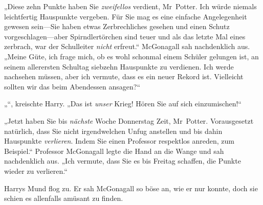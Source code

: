 „Diese zehn Punkte haben Sie \emph{zweifellos} verdient, Mr~Potter. Ich würde niemals leichtfertig Hauspunkte vergeben. Für Sie mag es eine einfache Angelegenheit gewesen sein—Sie haben etwas Zerbrechliches gesehen und einen Schutz vorgeschlagen—aber Spirndlertörchen sind teuer und als das letzte Mal eines zerbrach, war der Schulleiter \emph{nicht} erfreut.“ McGonagall sah nachdenklich aus. „Meine Güte, ich frage mich, ob es wohl schonmal einem Schüler gelungen ist, an seinem allerersten Schultag siebzehn Hauspunkte zu verdienen. Ich werde nachsehen müssen, aber ich vermute, dass es ein neuer Rekord ist. Vielleicht sollten wir das beim Abendessen ansagen?“

„“, kreischte Harry. „Das ist \emph{unser} Krieg! Hören Sie auf sich einzumischen!“

„Jetzt haben Sie bis \emph{nächste} Woche Donnerstag Zeit, Mr~Potter. Vorausgesetzt natürlich, dass Sie nicht irgendwelchen Unfug anstellen und bis dahin Hauspunkte \emph{verlieren}. Indem Sie einen Professor respektlos anreden, zum Beispiel.“ Professor McGonagall legte die Hand an die Wange und sah nachdenklich aus. „Ich vermute, dass Sie es bis Freitag schaffen, die Punkte wieder zu verlieren.“

Harrys Mund flog zu. Er sah McGonagall so böse an, wie er nur konnte, doch sie schien es allenfalls amüsant zu finden.

